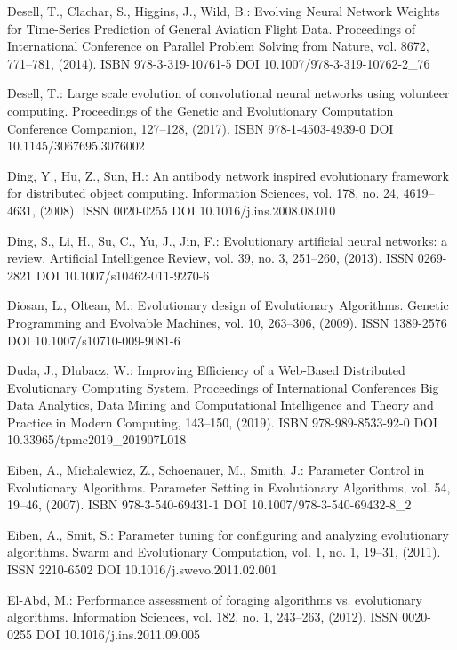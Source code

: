 \begin{thebibliography}{99.}
 Desell, T., Clachar, S., Higgins, J., Wild, B.: Evolving Neural Network Weights for Time-Series Prediction of General Aviation Flight Data. Proceedings of International Conference on Parallel Problem Solving from Nature, vol. 8672, 771--781, (2014). ISBN 978-3-319-10761-5 DOI 10.1007/978-3-319-10762-2\_76

 Desell, T.: Large scale evolution of convolutional neural networks using volunteer computing. Proceedings of the Genetic and Evolutionary Computation Conference Companion, 127--128, (2017). ISBN 978-1-4503-4939-0 DOI 10.1145/3067695.3076002

 Ding, Y., Hu, Z., Sun, H.: An antibody network inspired evolutionary framework for distributed object computing. Information Sciences, vol. 178, no. 24, 4619--4631, (2008). ISSN 0020-0255 DOI 10.1016/j.ins.2008.08.010

 Ding, S., Li, H., Su, C., Yu, J., Jin, F.: Evolutionary artificial neural networks: a review. Artificial Intelligence Review, vol. 39, no. 3, 251--260, (2013). ISSN 0269-2821 DOI 10.1007/s10462-011-9270-6

 Diosan, L., Oltean, M.: Evolutionary design of Evolutionary Algorithms. Genetic Programming and Evolvable Machines, vol. 10, 263--306, (2009). ISSN 1389-2576 DOI 10.1007/s10710-009-9081-6

 Duda, J., Dlubacz, W.: Improving Efficiency of a Web-Based Distributed Evolutionary Computing System. Proceedings of International Conferences Big Data Analytics, Data Mining and Computational Intelligence and Theory and Practice in Modern Computing, 143--150, (2019). ISBN 978-989-8533-92-0 DOI 10.33965/tpmc2019\_201907L018

 Eiben, A., Michalewicz, Z., Schoenauer, M., Smith, J.: Parameter Control in Evolutionary Algorithms. Parameter Setting in Evolutionary Algorithms, vol. 54, 19--46, (2007). ISBN 978-3-540-69431-1 DOI 10.1007/978-3-540-69432-8\_2

 Eiben, A., Smit, S.: Parameter tuning for configuring and analyzing evolutionary algorithms. Swarm and Evolutionary Computation, vol. 1, no. 1, 19--31, (2011). ISSN 2210-6502 DOI 10.1016/j.swevo.2011.02.001

 El-Abd, M.: Performance assessment of foraging algorithms vs. evolutionary algorithms. Information Sciences, vol. 182, no. 1, 243--263, (2012). ISSN 0020-0255 DOI 10.1016/j.ins.2011.09.005


\end{thebibliography}
